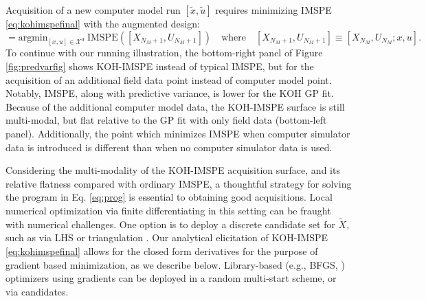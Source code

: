 \documentclass[
]{article}
\begin{document}
Acquisition of a new computer model run \([\tilde{x}, \tilde{u}]\) requires minimizing IMSPE \eqref{eq:kohimspefinal} with the augmented design:
\begin{equation}
[\tilde{x},\tilde{u}] = \mathrm{argmin}_{[x,u] \in \mathcal{X}^d} \ \mathrm{IMSPE}([X_{N_M + 1}, U_{N_M +1}]) \quad \mbox{where} \quad [X_{N_M + 1}, U_{N_M + 1}] \equiv [X_{N_M}, U_{N_M};x,u].
\label{eq:prog}
\end{equation}
To continue with our running illustration, the bottom-right panel of Figure \ref{fig:predvarfig} shows KOH-IMSPE instead of typical IMSPE, but for the acquisition of an additional field data point instead of computer model point. Notably, IMSPE, along with predictive variance, is lower for the KOH GP fit. Because of the additional computer model data, the KOH-IMSPE surface is still multi-modal, but flat relative to the GP fit with only field data (bottom-left panel). Additionally, the point which minimizes IMSPE when computer simulator data is introduced is different than when no computer simulator data is used.

Considering the multi-modality of the KOH-IMSPE acquisition surface, and its
relative flatness compared with ordinary IMSPE, a thoughtful strategy for
solving the program in Eq. \eqref{eq:prog} is essential to obtaining good
acquisitions. Local numerical optimization via finite differentiating in this
setting can be fraught with numerical challenges. One option is to deploy a
discrete candidate set for \(\tilde{X}\), such as via LHS or
triangulation \citep{gramacy2022triangulation}. Our analytical elicitation of
KOH-IMSPE \eqref{eq:kohimspefinal} allows for the closed form
derivatives for the purpose of gradient based minimization, as we describe
below. Library-based (e.g., BFGS, \citet{byrd1995limited}) optimizers using
gradients can be deployed in a random multi-start scheme, or via candidates.
\end{document}
